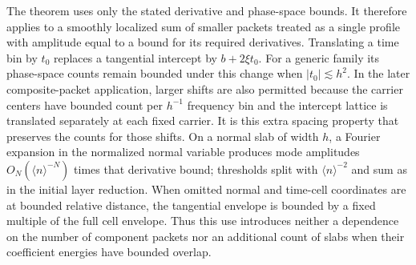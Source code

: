\begin{remark}
\label{rem:frame-composites}
The theorem uses only the stated derivative and phase-space bounds.
It therefore applies to a smoothly localized sum of smaller packets
treated as a single profile with amplitude equal to a bound for its
required derivatives.  Translating a time bin by $t_0$ replaces a
tangential intercept by $b+2\xi t_0$.  For a generic family its
phase-space counts remain bounded under this change when
$|t_0|\lesssim h^2$.  In the later composite-packet application,
larger shifts are also permitted because the carrier centers have
bounded count per $h^{-1}$ frequency bin and the intercept lattice
is translated separately at each fixed carrier.  It is this extra
spacing property that preserves the counts for those shifts.
On a normal slab of width $h$,
a Fourier expansion in the normalized normal variable produces mode
amplitudes $O_N(\langle n\rangle^{-N})$ times that derivative bound;
thresholds split with $\langle n\rangle^{-2}$ and sum as in the
initial layer reduction.  When omitted normal and time-cell
coordinates are at bounded relative distance, the tangential
envelope is bounded by a fixed multiple of the full cell envelope.
Thus this use introduces neither a dependence on the number of
component packets nor an additional count of slabs when their
coefficient energies have bounded overlap.
\end{remark}
